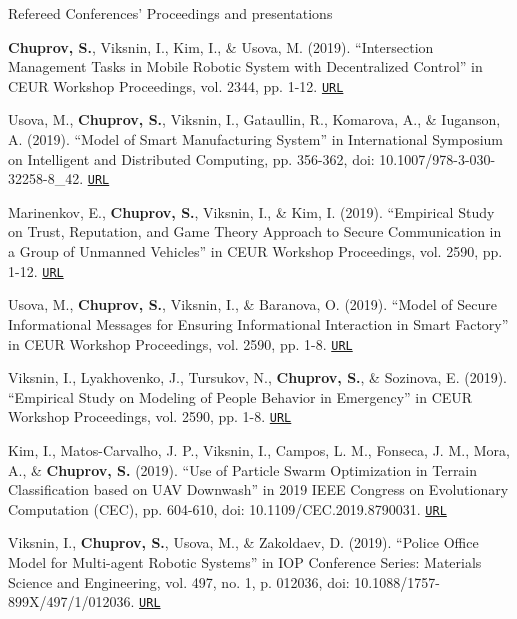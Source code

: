 \begin{rSection}{Refereed Conferences' Proceedings and presentations}
\begin{enumerate}[label=[C{{\arabic*}]}]
\item \textbf{Chuprov, S.}, Viksnin, I., Kim, I., \& Usova, M. (2019). ``Intersection Management Tasks in Mobile Robotic System with Decentralized Control'' in CEUR Workshop Proceedings, vol. 2344, pp. 1-12. \href{http://ceur-ws.org/Vol-2344/paper7.pdf}{\nolinkurl{URL}}

\item Usova, M., \textbf{Chuprov, S.}, Viksnin, I., Gataullin, R., Komarova, A., \& Iuganson, A. (2019). ``Model of Smart Manufacturing System'' in International Symposium on Intelligent and Distributed Computing, pp. 356-362, doi: 10.1007/978-3-030-32258-8\_42. \href{https://link.springer.com/chapter/10.1007/978-3-030-32258-8_42}{\nolinkurl{URL}}

\item Marinenkov, E., \textbf{Chuprov, S.}, Viksnin, I., \& Kim, I. (2019). ``Empirical Study on Trust, Reputation, and Game Theory Approach to Secure Communication in a Group of Unmanned Vehicles'' in CEUR Workshop Proceedings, vol. 2590, pp. 1-12. \href{http://ceur-ws.org/Vol-2590/paper28.pdf}{\nolinkurl{URL}}

\item Usova, M., \textbf{Chuprov, S.}, Viksnin, I., \& Baranova, O. (2019). ``Model of Secure Informational Messages for Ensuring Informational Interaction in Smart Factory'' in CEUR Workshop Proceedings, vol. 2590, pp. 1-8. \href{http://ceur-ws.org/Vol-2590/short28.pdf}{\nolinkurl{URL}}

\item Viksnin, I., Lyakhovenko, J., Tursukov, N., \textbf{Chuprov, S.}, \& Sozinova, E. (2019). ``Empirical Study on Modeling of People Behavior in Emergency'' in CEUR Workshop Proceedings, vol. 2590, pp. 1-8. \href{http://ceur-ws.org/Vol-2590/short33.pdf}{\nolinkurl{URL}}

\item Kim, I., Matos-Carvalho, J. P., Viksnin, I., Campos, L. M., Fonseca, J. M., Mora, A., \& \textbf{Chuprov, S.} (2019). ``Use of Particle Swarm Optimization in Terrain Classification based on UAV Downwash'' in 2019 IEEE Congress on Evolutionary Computation (CEC), pp. 604-610, doi: 10.1109/CEC.2019.8790031. \href{https://ieeexplore.ieee.org/abstract/document/8790031/}{\nolinkurl{URL}}

\item Viksnin, I., \textbf{Chuprov, S.}, Usova, M., \& Zakoldaev, D. (2019). ``Police Office Model for Multi-agent Robotic Systems'' in IOP Conference Series: Materials Science and Engineering, vol. 497, no. 1, p. 012036, doi: 10.1088/1757-899X/497/1/012036. \href{https://iopscience.iop.org/article/10.1088/1757-899X/497/1/012036/meta}{\nolinkurl{URL}}

\end{enumerate}
\end{rSection}

